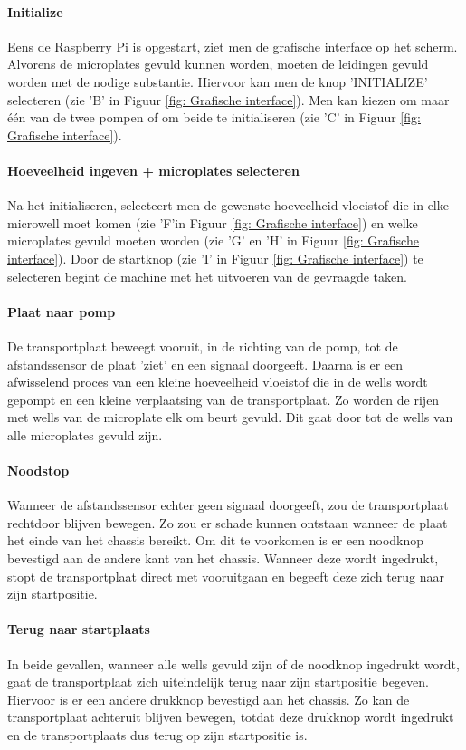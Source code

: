 \documentclass[a4paper,twoside,kulak]{kulakreport} %
\begin{document}
\paragraph{Initialize} 

Eens de Raspberry Pi is opgestart, ziet men de grafische interface op het scherm. Alvorens de microplates gevuld kunnen worden, moeten de leidingen gevuld worden met de nodige substantie. Hiervoor kan men de knop 'INITIALIZE' selecteren (zie 'B' in Figuur \ref{fig: Grafische interface}). Men kan kiezen om maar één van de twee pompen of om beide te initialiseren (zie 'C' in Figuur \ref{fig: Grafische interface}). 
\paragraph{Hoeveelheid ingeven + microplates selecteren}
Na het initialiseren, selecteert men de gewenste hoeveelheid vloeistof die in elke microwell moet komen (zie 'F'in Figuur \ref{fig: Grafische interface}) en welke microplates gevuld moeten worden (zie 'G' en 'H' in Figuur \ref{fig: Grafische interface}). Door de startknop (zie 'I' in Figuur \ref{fig: Grafische interface}) te selecteren begint de machine met het uitvoeren van de gevraagde taken. 
\paragraph{Plaat naar pomp}
De transportplaat beweegt vooruit, in de richting van de pomp, tot de afstandssensor de plaat 'ziet' en een signaal doorgeeft. Daarna is er een afwisselend proces van een kleine hoeveelheid vloeistof die in de wells wordt gepompt en een kleine verplaatsing van de transportplaat. Zo worden de rijen met wells van de microplate elk om beurt gevuld. Dit gaat door tot de wells van alle microplates gevuld zijn.
\paragraph{Noodstop}
Wanneer de afstandssensor echter geen signaal doorgeeft, zou de transportplaat rechtdoor blijven  bewegen. Zo zou er schade kunnen ontstaan wanneer de plaat het einde van het chassis bereikt. Om dit te voorkomen is er een noodknop bevestigd aan de andere kant van het chassis. Wanneer deze wordt ingedrukt, stopt de transportplaat direct met vooruitgaan en begeeft deze zich terug naar  zijn startpositie. 
\paragraph{Terug naar startplaats}
In beide gevallen, wanneer alle wells gevuld zijn of de noodknop ingedrukt wordt, gaat de transportplaat zich uiteindelijk terug naar zijn startpositie begeven. Hiervoor is er een andere drukknop bevestigd aan het chassis. Zo kan de transportplaat achteruit blijven bewegen, totdat deze drukknop wordt ingedrukt en de transportplaats dus terug op zijn startpositie is. 
\end{document}
